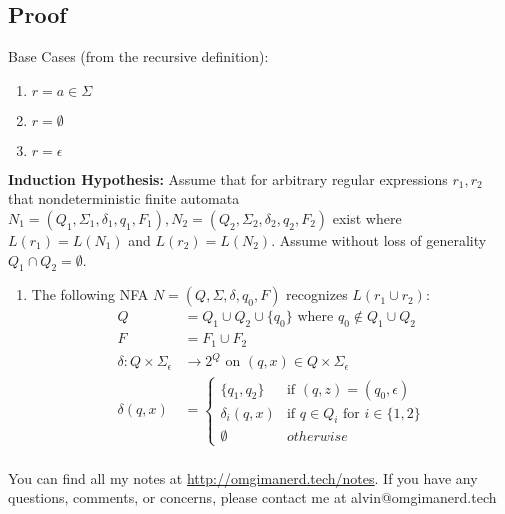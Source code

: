 \documentclass[letterpaper, 12pt]{math}
\begin{document}
\subsection*{Proof}
Base Cases (from the recursive definition):
\begin{enumerate}[{Case} 1:]
  \item \( r = a\in\Sigma \)
  \item \( r = \emptyset \)
  \item \( r = \epsilon \)
\end{enumerate}
\textbf{Induction Hypothesis:} Assume that for arbitrary regular expressions
\( r_1,r_2 \) that nondeterministic finite automata \( N_1 =
(Q_1,\Sigma_1,\delta_1,q_1,F_1), N_2 = (Q_2,\Sigma_2,\delta_2,q_2,F_2) \) exist
where \( L(r_1) = L(N_1) \) and \( L(r_2) = L(N_2) \). Assume without loss of
generality \( Q_1\cap Q_2 = \emptyset \).
\begin{enumerate}[{Case} 1:]
  \item The following NFA \( N = (Q,\Sigma,\delta,q_0,F) \) recognizes
  \( L(r_1\cup r_2) \):
  \begin{align*}
    Q &= Q_1\cup Q_2\cup \{q_0\} \text{ where } q_0\notin Q_1\cup Q_2 \\
    F &= F_1\cup F_2 \\
    \delta:Q\times\Sigma_{\epsilon} &\to 2^Q\text{ on }(q,x)\in
      Q\times\Sigma_{\epsilon} \\
    \delta(q,x) &= \begin{cases}
      \{q_1,q_2\} & \text{if } (q,z) = (q_0,\epsilon) \\
      \delta_i(q,x) & \text{if } q\in Q_i\text{ for }i\in\{1,2\} \\
      \emptyset & otherwise
    \end{cases} \\
  \end{align*}
\end{enumerate}

\begin{center}
  You can find all my notes at \url{http://omgimanerd.tech/notes}. If you have
  any questions, comments, or concerns, please contact me at
  alvin@omgimanerd.tech
\end{center}
\end{document}
